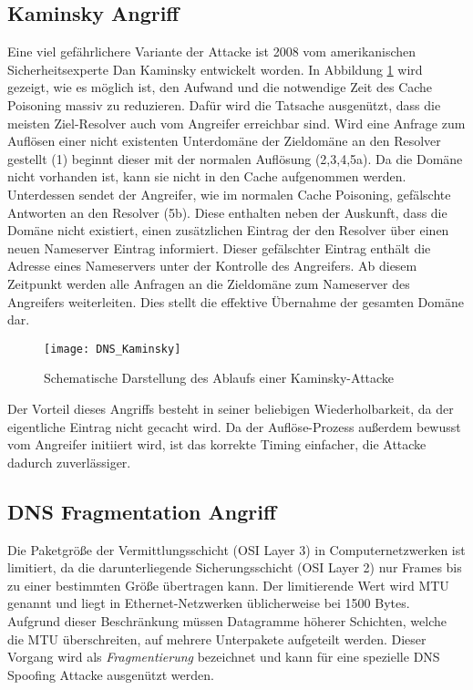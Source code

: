\subsection{Kaminsky Angriff}
Eine viel gefährlichere Variante der Attacke ist 2008 vom amerikanischen Sicherheitsexperte Dan Kaminsky entwickelt worden\cite{Son2010}. In Abbildung \ref{img:dnskaminsky} wird gezeigt, wie es möglich ist, den Aufwand und die notwendige Zeit des Cache Poisoning massiv zu reduzieren. Dafür wird die Tatsache ausgenützt, dass die meisten Ziel-Resolver auch vom Angreifer erreichbar sind. Wird eine Anfrage zum Auflösen einer nicht existenten Unterdomäne der Zieldomäne an den Resolver gestellt (1) beginnt dieser mit der normalen Auflösung (2,3,4,5a). Da die Domäne nicht vorhanden ist, kann sie nicht in den Cache aufgenommen werden. Unterdessen sendet der Angreifer, wie im normalen Cache Poisoning, gefälschte Antworten an den Resolver (5b). Diese enthalten neben der Auskunft, dass die Domäne nicht existiert, einen zusätzlichen Eintrag der den Resolver über einen neuen Nameserver Eintrag informiert. Dieser gefälschter Eintrag enthält die Adresse eines Nameservers unter der Kontrolle des Angreifers. Ab diesem Zeitpunkt werden alle Anfragen an die Zieldomäne zum Nameserver des Angreifers weiterleiten. Dies stellt die effektive Übernahme der gesamten Domäne dar.

\begin{figure}[!hb]
    \centering
    \texttt{[image: DNS\_Kaminsky]}
    \caption{Schematische Darstellung des Ablaufs einer Kaminsky-Attacke}
    \label{img:dnskaminsky}
\end{figure}

Der Vorteil dieses Angriffs besteht in seiner beliebigen Wiederholbarkeit, da der eigentliche Eintrag nicht gecacht wird. Da der Auflöse-Prozess außerdem bewusst vom Angreifer initiiert wird, ist das korrekte Timing einfacher, die Attacke dadurch zuverlässiger.

\subsection{DNS Fragmentation Angriff}
Die Paketgröße der Vermittlungsschicht (OSI Layer 3) in Computernetzwerken ist limitiert, da die darunterliegende Sicherungsschicht (OSI Layer 2) nur Frames bis zu einer bestimmten Größe übertragen kann. Der limitierende Wert wird \ac{MTU} genannt und liegt in Ethernet-Netzwerken üblicherweise bei 1500 Bytes. Aufgrund dieser Beschränkung müssen Datagramme höherer Schichten, welche die MTU überschreiten, auf mehrere Unterpakete aufgeteilt werden. Dieser Vorgang wird als \textit{Fragmentierung} bezeichnet und kann für eine spezielle DNS Spoofing Attacke ausgenützt werden.

